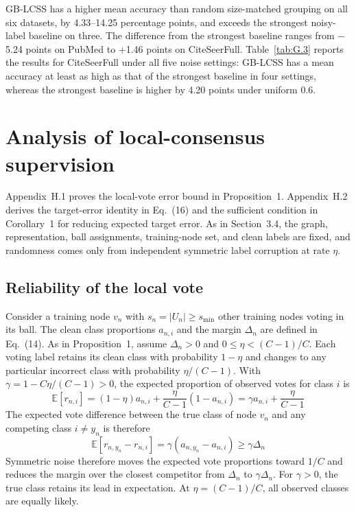\documentclass[10pt,letterpaper,nopreprintline]{elsarticle}
\begin{document}
GB-LCSS has a higher mean accuracy than random size-matched grouping on all six datasets, by 4.33--14.25 percentage points, and exceeds the strongest noisy-label baseline on three. The difference from the strongest baseline ranges from \ensuremath{-}5.24 points on PubMed to +1.46 points on CiteSeerFull. Table~\ref{tab:G.3} reports the results for CiteSeerFull under all five noise settings: GB-LCSS has a mean accuracy at least as high as that of the strongest baseline in four settings, whereas the strongest baseline is higher by 4.20 points under uniform 0.6.



\FloatBarrier
\setcounter{table}{0}
\section{Analysis of local-consensus supervision}\label{sec:H}
\setcounter{equation}{0}
\renewcommand{\theequation}{H.\arabic{equation}}
\renewcommand{\theHequation}{H.\arabic{equation}}

Appendix~H.1 proves the local-vote error bound in Proposition~1. Appendix~H.2 derives the target-error identity in Eq.~(16) and the sufficient condition in Corollary~1 for reducing expected target error. As in Section~3.4, the graph, representation, ball assignments, training-node set, and clean labels are fixed, and randomness comes only from independent symmetric label corruption at rate \(\eta\).

\subsection{Reliability of the local vote}\label{sec:H.1}

Consider a training node \(v_n\) with \(s_n=|U_n|\geq s_{\min}\) other training nodes voting in its ball. The clean class proportions \(a_{n,i}\) and the margin \(\Delta_n\) are defined in Eq.~(14). As in Proposition~1, assume \(\Delta_n>0\) and \(0\leq\eta<(C-1)/C\). Each voting label retains its clean class with probability \(1-\eta\) and changes to any particular incorrect class with probability \(\eta/(C-1)\). With \(\gamma=1-C\eta/(C-1)>0\), the expected proportion of observed votes for class \(i\) is
\begin{equation}\label{eq:H.1}
\mathbb{E}[r_{n,i}]=(1-\eta)a_{n,i}
+\frac{\eta}{C-1}(1-a_{n,i})
=\gamma a_{n,i}+\frac{\eta}{C-1}
\end{equation}
The expected vote difference between the true class of node \(v_n\) and any competing class \(i\ne y_n\) is therefore
\begin{equation}\label{eq:H.2}
\mathbb{E}[r_{n,y_n}-r_{n,i}]
=\gamma(a_{n,y_n}-a_{n,i})\geq\gamma\Delta_n
\end{equation}
Symmetric noise therefore moves the expected vote proportions toward \(1/C\) and reduces the margin over the closest competitor from \(\Delta_n\) to \(\gamma\Delta_n\). For \(\gamma>0\), the true class retains its lead in expectation. At \(\eta=(C-1)/C\), all observed classes are equally likely.
\end{document}
